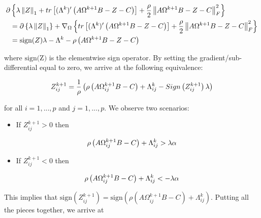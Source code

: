 \documentclass[11pt,]{report}
\providecommand{\tightlist}{%
  \setlength{\itemsep}{0pt}\setlength{\parskip}{0pt}}
\theoremstyle{definition}
\theoremstyle{definition}
\theoremstyle{definition}
\theoremstyle{remark}
\begin{document}
\begin{equation}
\begin{split}
  \partial&\left\{ \lambda\left\| Z \right\|_{1} + tr\left[(\Lambda^{k})'\left(A\Omega^{k + 1}B - Z - C\right)\right] + \frac{\rho}{2}\left\| A\Omega^{k + 1}B - Z - C \right\|_{F}^{2} \right\} \\
  &= \partial\left\{ \lambda\left\| Z \right\|_{1} \right\} + \nabla_{\Omega}\left\{ tr\left[(\Lambda^{k})'\left(A\Omega^{k + 1}B - Z - C\right)\right] + \frac{\rho}{2}\left\| A\Omega^{k + 1}B - Z - C \right\|_{F}^{2} \right\} \\
  &= \mbox{sign}(Z)\lambda - \Lambda^{k} - \rho\left( A\Omega^{k + 1}B - Z - C \right)
\end{split}
\label{eq:appendixZZgradient2}\notag
\end{equation}

where \(\mbox{sign(Z)}\) is the elementwise sign operator. By setting the gradient/sub-differential equal to zero, we arrive at the following equivalence:

\begin{equation}
Z_{ij}^{k + 1} = \frac{1}{\rho}\left( \rho\left(A\Omega_{ij}^{k + 1}B - C\right) + \Lambda_{ij}^{k} - Sign\left(Z_{ij}^{k + 1}\right)\lambda \right)
\label{eq:ZZsoftproof2}\notag
\end{equation}

for all \(i = 1,..., p\) and \(j = 1,..., p\). We observe two scenarios:

\begin{itemize}
\tightlist
\item
  If \(Z_{ij}^{k + 1} > 0\) then
\end{itemize}

\begin{equation}
\rho\left(A\Omega_{ij}^{k + 1}B - C\right) + \Lambda_{ij}^{k} > \lambda\alpha \notag
\end{equation}

\begin{itemize}
\tightlist
\item
  If \(Z_{ij}^{k + 1} < 0\) then
\end{itemize}

\begin{equation}
\rho\left(A\Omega_{ij}^{k + 1}B - C\right) + \Lambda_{ij}^{k} < -\lambda\alpha \notag
\end{equation}

This implies that \(\mbox{sign}\left(Z_{ij}^{k + 1}\right) = \mbox{sign}\left(\rho\left(A\Omega_{ij}^{k + 1}B - C\right) + \Lambda_{ij}^{k}\right)\). Putting all the pieces together, we arrive at
\end{document}
